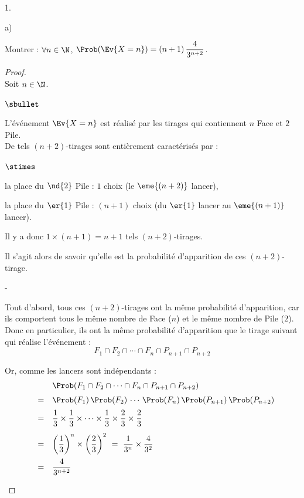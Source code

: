 \begin{noliste}{1.}
\begin{noliste}{a)}
    
    \item Montrer : $\forall n \in \N$, $\Prob(\Ev{X=n}) = (n+1) \,
    \dfrac{4}{3^{n+2}}$.
    
    \begin{proof}~\\
      Soit $n\in \N$.
      \begin{noliste}{$\sbullet$}
	\item L'événement $\Ev{X=n}$ est réalisé par les tirages qui 
	contiennent $n$ Face et $2$ Pile.\\
	De tels $(n+2)$-tirages sont entièrement caractérisés par :
	\begin{noliste}{$\stimes$}
	  \item la place du $\nd{2}$ Pile : $1$ choix (le $\eme{(n+2)}$
	  lancer),
	  \item la place du $\er{1}$ Pile : $(n+1)$ choix (du 
	  $\er{1}$ lancer au $\eme{(n+1)}$ lancer).
	\end{noliste}
	Il y a donc $1 \times (n+1) = n+1$ tels $(n+2)$-tirages.
	
	\item Il s'agit alors de savoir qu'elle est la probabilité 
	d'apparition de ces $(n+2)$-tirage.
	\begin{noliste}{-}
	  \item Tout d'abord, tous ces $(n+2)$-tirages ont la même 
	  probabilité d'apparition, car ils comportent tous le 
	  même nombre de Face ($n$) et le même nombre de Pile ($2$).\\
	  Donc en particulier, ils ont la même probabilité
	  d'apparition que le
	  tirage suivant qui réalise l'événement :
	  \[
	    F_1 \cap F_2 \cap \cdots \cap F_n \cap P_{n+1} \cap 
	    P_{n+2}
	  \]
	  
	  
	  \newpage
	  
	  
	  \item Or, comme les lancers sont indépendants :
	  \[
	    \begin{array}{rcl}
	      & &\Prob(F_1 \cap F_2 \cap \cdots \cap F_n \cap P_{n+1} 
	      \cap P_{n+2})
	      \\[.2cm]
	      & = &  \Prob(F_1) \, \Prob(F_2) \, \cdots \, \Prob(F_n) \, 
	      \Prob(P_{n+1}) \, \Prob(P_{n+2})
	      \\[.2cm]
	      & = &  \dfrac{1}{3} \times \dfrac{1}{3} \times \cdots \times 
	      \dfrac{1}{3} \times \dfrac{2}{3} \times \dfrac{2}{3}
	      \\[.4cm]
	      & = &  \left(\dfrac{1}{3}\right)^n \times \left(
	      \dfrac{2}{3}\right)^2 
	      \ = \ \dfrac{1}{3^n} \times \dfrac{4}{3^2}
	      \\[.4cm]
	      & = &  \dfrac{4}{3^{n+2}}
	    \end{array}
	  \]
	\end{noliste}
      \end{noliste}
      

\end{proof}
\end{noliste}
\end{noliste}
